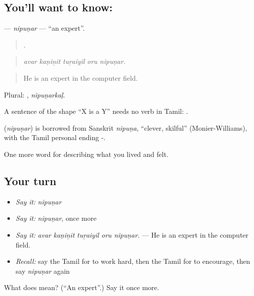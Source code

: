 \subsection*{You'll want to know: }
\textbf{} — \emph{nipuṇar} — \textquotedblleft{}an expert\textquotedblright{}.

\begin{quote}
    .
\end{quote}

\begin{quote}
\emph{avar kaṇiṉit tuṟaiyil oru nipuṇar.}
\end{quote}

\begin{quote}
He is an expert in the computer field.
\end{quote}

Plural: , \emph{nipuṇarkaḷ}.

A sentence of the shape \textquotedblleft{}X is a Y\textquotedblright{} needs no verb in Tamil:   .

\begin{cousinweb}
\textbf{} (\emph{nipuṇar}) is borrowed from Sanskrit \emph{nipuṇa}, \textquotedblleft{}clever, skilful\textquotedblright{} (Monier-Williams), with the Tamil personal ending -.
\end{cousinweb}

\begin{grammarlens}[title={What you've built}]
One more word for describing what you lived and felt.
\end{grammarlens}

\subsection*{Your turn}
\begin{itemize}
\raggedright
  \item \emph{Say it:} \emph{nipuṇar}
  \item \emph{Say it:} \emph{nipuṇar}, once more
  \item \emph{Say it:} \emph{avar kaṇiṉit tuṟaiyil oru nipuṇar.} — He is an expert in the computer field.
  \item \emph{Recall:} say the Tamil for to work hard, then the Tamil for to encourage, then say \emph{nipuṇar} again
\end{itemize}

\begin{tcolorbox}[breakable,colback=teal!4,colframe=teal!35!black,title={Before you move on}]
What does  mean? (\textquotedblleft{}An expert\textquotedblright{}.) Say it once more.
\end{tcolorbox}
